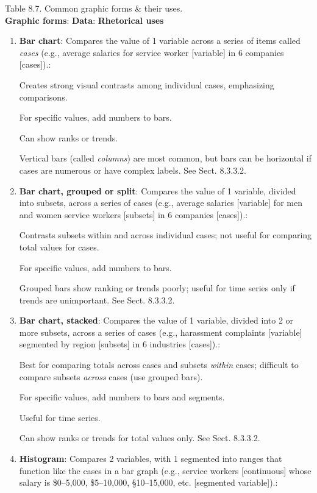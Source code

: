 \documentclass[oneside]{book}
\numberwithin{equation}{section}
\begin{document}
\textsf{Table 8.7. Common graphic forms \& their uses.}\\
\textbf{Graphic forms}: \textbf{Data}: \textbf{Rhetorical uses}
\begin{enumerate}
    \item \textbf{Bar chart}: Compares the value of 1 variable across a series of items called \textit{cases} (e.g., average salaries for service worker [variable] in 6 companies [cases]).:
    
    Creates strong visual contrasts among individual cases, emphasizing comparisons.
    
    For specific values, add numbers to bars.
    
    Can show ranks or trends.
    
    Vertical bars (called \textit{columns}) are most common, but bars can be horizontal if cases are numerous or have complex labels. See Sect. 8.3.3.2.
    \item \textbf{Bar chart, grouped or split}: Compares the value of 1 variable, divided into subsets, across a series of cases (e.g., average salaries [variable] for men and women service workers [subsets] in 6 companies [cases]).:
    
    Contrasts subsets within and across individual cases; not useful for comparing total values for cases.
    
    For specific values, add numbers to bars.
    
    Grouped bars show ranking or trends poorly; useful for time series only if trends are unimportant. See Sect. 8.3.3.2.
    \item \textbf{Bar chart, stacked}: Compares the value of 1 variable, divided into 2 or more subsets, across a series of cases (e.g., harassment complaints [variable] segmented by region [subsets] in 6 industries [cases]).:
    
    Best for comparing totals across cases and subsets \textit{within} cases; difficult to compare subsets \textit{across} cases (use grouped bars).
    
    For specific values, add numbers to bars and segments.
    
    Useful for time series.
    
    Can show ranks or trends for total values only. See Sect. 8.3.3.2.
    \item \textbf{Histogram}: Compares 2 variables, with 1 segmented into ranges that function like the cases in a bar graph (e.g., service workers [continuous] whose salary is \$0--5,000, \$5--10,000, \S10--15,000, etc. [segmented variable]).:
    

\end{enumerate}
\end{document}
